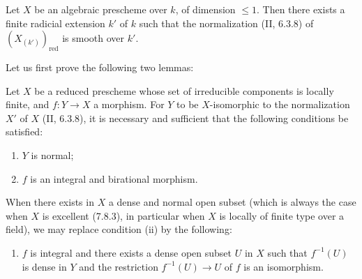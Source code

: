 \begin{proposition}[17.15.14]
\label{IV.17.15.14}
Let $X$ be an algebraic prescheme over $k$, of dimension $\leq1$. Then there exists a finite radicial extension $k'$ of $k$ such that the normalization (II, 6.3.8) of $(X_{(k')})_{\mathrm{red}}$ is smooth over $k'$.
\end{proposition}

Let us first prove the following two lemmas:

\begin{lemma}[17.15.14.1]
\label{IV.17.15.14.1}
Let $X$ be a reduced prescheme whose set of irreducible components is locally finite, and $f:Y\to X$ a morphism. For $Y$ to be $X$-isomorphic to the normalization $X'$ of $X$ (II, 6.3.8), it is necessary and sufficient that the following conditions be satisfied:
\begin{enumerate}
  \item[(i)] $Y$ is normal;
  \item[(ii)] $f$ is an integral and birational morphism.
\end{enumerate}
When there exists in $X$ a dense and normal open subset (which is always the case when $X$ is excellent (7.8.3), in particular when $X$ is locally of finite type over a field), we may replace condition (ii) by the following:
\begin{enumerate}
  \item[(ii bis)] $f$ is integral and there exists a dense open subset $U$ in $X$ such that $f^{-1}(U)$ is dense in $Y$ and the restriction $f^{-1}(U)\to U$ of $f$ is an isomorphism.
\end{enumerate}
\end{lemma}

